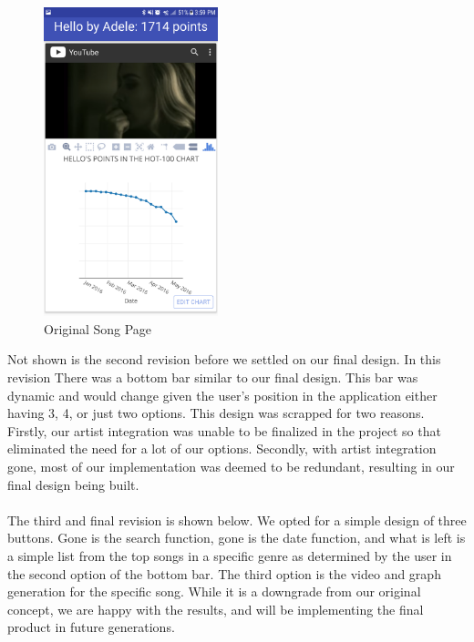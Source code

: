 \documentclass{article}
\newcommand\tab[1][1cm]{\hspace*{#1}}
\begin{document}
\begin{figure}[H]
  \begin{center}
    \includegraphics[width=0.45\textwidth]{original_song_graph.png}
    \caption{Original Song Page}
    \label{fig:ER}
  \end{center}
\end{figure}
Not shown is the second revision before we settled on our final design. In this revision There was a bottom bar similar to our final design. This bar was dynamic and would change given the user's position in the application either having 3, 4, or just two options. This design was scrapped for two reasons. Firstly, our artist integration was unable to be finalized in the project so that eliminated the need for a lot of our options. Secondly, with artist integration gone, most of our implementation was deemed to be redundant, resulting in our final design being built. 
\\ \\ \tab The third and final revision is shown below. We opted for a simple design of three buttons. Gone is the search function, gone is the date function, and what is left is a simple list from the top songs in a specific genre as determined by the user in the second option of the bottom bar. The third option is the video and graph generation for the specific song. While it is a downgrade from our original concept, we are happy with the results, and will be implementing the final product in future generations. 
\end{document}
